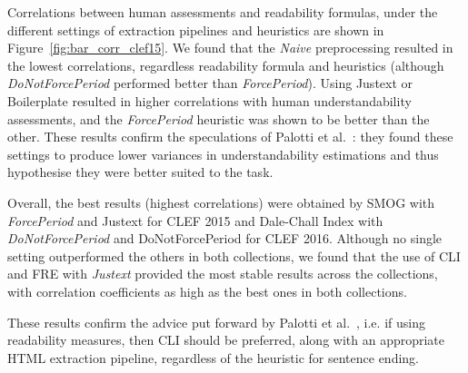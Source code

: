 Correlations between human assessments and readability formulas, under the different settings of extraction pipelines and heuristics are shown in Figure~\ref{fig:bar_corr_clef15}. We found that the \textit{Naive} preprocessing resulted in the lowest correlations, regardless readability formula and heuristics (although \textit{DoNotForcePeriod} performed better than \textit{ForcePeriod}). Using Justext or Boilerplate resulted in higher correlations with human understandability assessments, and the \textit{ForcePeriod} heuristic was shown to be better than the other. These results confirm the speculations of Palotti et al.~\cite{palotti15}: they found these settings to produce lower variances in understandability estimations and thus hypothesise they were better suited to the task.

Overall, the best results (highest correlations) were obtained by SMOG with \textit{ForcePeriod} and Justext for CLEF 2015 and Dale-Chall Index with \textit{DoNotForcePeriod} and DoNotForcePeriod for CLEF 2016. Although no single setting outperformed the others in both collections, we found that the use of CLI and FRE with \textit{Justext} provided the most stable results across the collections, with correlation coefficients as high as the best ones in both collections.

These results confirm the advice put forward by Palotti et al.~\cite{palotti15}, i.e. if using readability measures, then CLI should be preferred, along with an appropriate HTML extraction pipeline, regardless of the heuristic for sentence ending.





